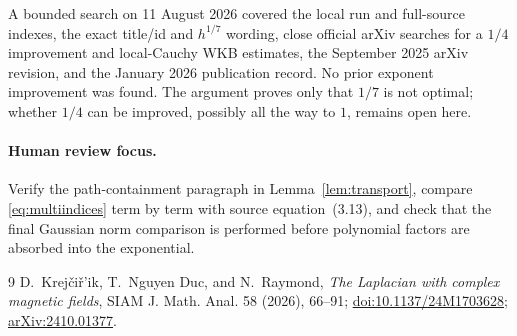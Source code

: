 \documentclass[11pt]{article}
\begin{document}
A bounded search on 11 August 2026 covered the local run and full-source
indexes, the exact title/id and $h^{1/7}$ wording, close official arXiv searches
for a $1/4$ improvement and local-Cauchy WKB estimates, the September 2025
arXiv revision, and the January 2026 publication record.  No prior exponent
improvement was found.  The argument proves only that $1/7$ is not optimal;
whether $1/4$ can be improved, possibly all the way to $1$, remains open here.

\paragraph{Human review focus.}
Verify the path-containment paragraph in Lemma~\ref{lem:transport}, compare
\eqref{eq:multiindices} term by term with source equation~(3.13), and check
that the final Gaussian norm comparison is performed before polynomial factors
are absorbed into the exponential.

\begin{thebibliography}{9}
D.~Krej\v{c}i\v{r}'ik, T.~Nguyen Duc, and N.~Raymond,
\emph{The Laplacian with complex magnetic fields},
SIAM J. Math. Anal. 58 (2026), 66--91;
\href{https://doi.org/10.1137/24M1703628}{doi:10.1137/24M1703628};
\href{https://arxiv.org/abs/2410.01377}{arXiv:2410.01377}.
\end{thebibliography}
\end{document}
